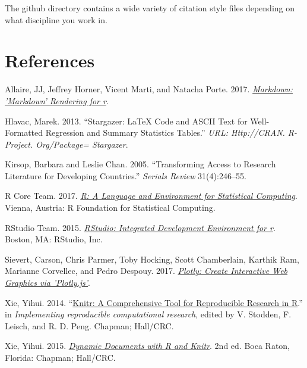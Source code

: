 \documentclass[
  12pt,
]{article}
\newlength{\cslhangindent}
\newlength{\cslentryspacingunit} %
\newenvironment{CSLReferences}[2] %
 {%
  \setlength{\parindent}{0pt}
  \ifodd #1
  \let\oldpar\par
  \def\par{\hangindent=\cslhangindent\oldpar}
  \fi
  \setlength{\parskip}{#2\cslentryspacingunit}
 }%
 {}
\begin{document}
The github directory contains a wide variety of citation style files depending on what discipline you work in.

\hypertarget{references}{%
\section{References}\label{references}}

\linespread{1}

\hypertarget{refs}{}
\begin{CSLReferences}{1}{0}
\leavevmode{}%
Allaire, JJ, Jeffrey Horner, Vicent Marti, and Natacha Porte. 2017. \emph{\href{https://CRAN.R-project.org/package=markdown}{Markdown: 'Markdown' Rendering for r}}.

\leavevmode{}%
Hlavac, Marek. 2013. {``Stargazer: LaTeX Code and ASCII Text for Well-Formatted Regression and Summary Statistics Tables.''} \emph{URL: Http://CRAN. R-Project. Org/Package= Stargazer}.

\leavevmode{}%
Kirsop, Barbara and Leslie Chan. 2005. {``Transforming Access to Research Literature for Developing Countries.''} \emph{Serials Review} 31(4):246--55.

\leavevmode{}%
R Core Team. 2017. \emph{\href{https://www.R-project.org/}{R: A Language and Environment for Statistical Computing}}. Vienna, Austria: R Foundation for Statistical Computing.

\leavevmode{}%
RStudio Team. 2015. \emph{\href{http://www.rstudio.com/}{RStudio: Integrated Development Environment for r}}. Boston, MA: RStudio, Inc.

\leavevmode{}%
Sievert, Carson, Chris Parmer, Toby Hocking, Scott Chamberlain, Karthik Ram, Marianne Corvellec, and Pedro Despouy. 2017. \emph{\href{https://CRAN.R-project.org/package=plotly}{Plotly: Create Interactive Web Graphics via 'Plotly.js'}}.

\leavevmode{}%
Xie, Yihui. 2014. {``\href{http://www.crcpress.com/product/isbn/9781466561595}{Knitr: A Comprehensive Tool for Reproducible Research in {R}}.''} in \emph{Implementing reproducible computational research}, edited by V. Stodden, F. Leisch, and R. D. Peng. Chapman; Hall/CRC.

\leavevmode{}%
Xie, Yihui. 2015. \emph{\href{https://yihui.name/knitr/}{Dynamic Documents with {R} and Knitr}}. 2nd ed. Boca Raton, Florida: Chapman; Hall/CRC.


\end{CSLReferences}
\end{document}
